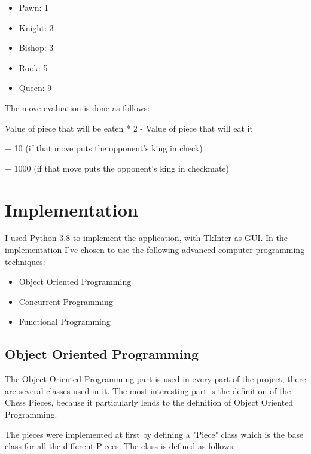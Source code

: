\documentclass[english]{article}
\begin{document}
\begin{itemize}
	\item Pawn: 1
	\item Knight: 3
	\item Bishop: 3
	\item Rook: 5
	\item Queen: 9
\end{itemize}

The move evaluation is done as follows:

Value of piece that will be eaten * 2 - Value of piece that will eat it

+ 10 (if that move puts the opponent's king in check) 

+  1000 (if that move puts the opponent's king in checkmate)

\section{Implementation}
I used Python 3.8 to implement the application, with TkInter as GUI.
In the implementation I've chosen to use the following advanced computer programming techniques:
\begin{itemize}
	\item Object Oriented Programming
	\item Concurrent Programming	
	\item Functional Programming
\end{itemize}

\subsection{Object Oriented Programming}
The Object Oriented Programming part is used in every part of the project, there are several classes used in it.
The most interesting part is the definition of the Chess Pieces, because it particularly lends to the definition of Object Oriented Programming.

The pieces were implemented at first by defining a  "Piece" class which is the base class for all the different Pieces.
The class is defined as follows:
\end{document}
